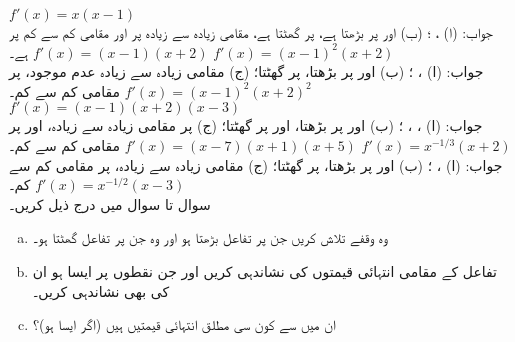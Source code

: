 $f'(x)=x(x-1)$\\
جواب:\quad
(ا) ، ؛ (ب)  اور  پر بڑھتا ہے،  پر گھٹتا ہے، مقامی زیادہ سے زیادہ  پر اور مقامی کم سے کم  پر ہے۔
$f'(x)=(x-1)(x+2)$
$f'(x)=(x-1)^2(x+2)$\\
جواب:\quad
(ا) ، ؛ (ب)  اور  پر بڑھتا،  پر گھٹتا؛ (ج) مقامی زیادہ سے زیادہ عدم موجود،  پر مقامی کم سے کم۔
$f'(x)=(x-1)^2(x+2)^2$
$f'(x)=(x-1)(x+2)(x-3)$\\
جواب:\quad
(ا) ، ، ؛ (ب)  اور  پر بڑھتا،  اور  پر گھٹتا؛ (ج)  پر مقامی زیادہ سے زیادہ،  اور  پر مقامی کم سے کم۔
$f'(x)=(x-7)(x+1)(x+5)$
$f'(x)=x^{-1/3}(x+2)$\\
جواب:\quad
(ا) ، ؛ (ب)  اور  پر بڑھتا،  پر گھٹتا؛ (ج)  مقامی زیادہ سے زیادہ،  پر مقامی کم سے کم۔
$f'(x)=x^{-1/2}(x-3)$
\\
سوال  تا سوال  میں درج ذیل کریں۔
\begin{enumerate}[a.]
\item
وہ وقفے تلاش کریں جن پر تفاعل بڑھتا ہو اور وہ جن پر تفاعل گھٹتا ہو۔
\item
 تفاعل کے مقامی انتہائی قیمتوں کی نشاندہی کریں اور جن نقطوں پر ایسا ہو ان کی بھی نشاندہی کریں۔
\item
ان میں سے کون سی  مطلق انتہائی قیمتیں ہیں (اگر ایسا ہو)؟
\end{enumerate}

